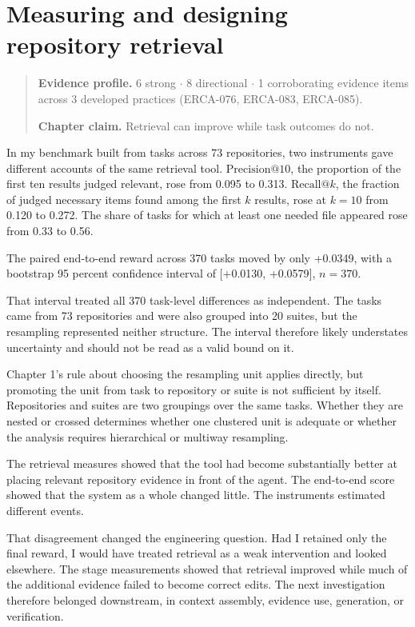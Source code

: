 \chapter{Measuring and designing repository retrieval}
\label{ch11-measuring-designing-repository-retrieval}
\begin{quote}
\textbf{Evidence profile.} 6 strong \(\cdot\) 8 directional \(\cdot\) 1 corroborating evidence items across 3 developed practices (ERCA-076, ERCA-083, ERCA-085).

\textbf{Chapter claim.} Retrieval can improve while task outcomes do not.
\end{quote}

In my benchmark built from tasks across 73 repositories, two instruments gave different accounts of the same retrieval tool. \(\mathrm{Precision}@10\), the proportion of the first ten results judged relevant, rose from 0.095 to 0.313. \textbf{\(\mathrm{Recall}@k\)}, the fraction of judged necessary items found among the first \(k\) results, rose at \(k = 10\) from 0.120 to 0.272. The share of tasks for which at least one needed file appeared rose from 0.33 to 0.56.

The paired end-to-end reward across 370 tasks moved by only +0.0349, with a bootstrap 95 percent confidence interval of {[}+0.0130, +0.0579{]}, \(n = 370\).

That interval treated all 370 task-level differences as independent. The tasks came from 73 repositories and were also grouped into 20 suites, but the resampling represented neither structure. The interval therefore likely understates uncertainty and should not be read as a valid bound on it.

Chapter 1's rule about choosing the resampling unit applies directly, but promoting the unit from task to repository or suite is not sufficient by itself. Repositories and suites are two groupings over the same tasks. Whether they are nested or crossed determines whether one clustered unit is adequate or whether the analysis requires hierarchical or multiway resampling.

The retrieval measures showed that the tool had become substantially better at placing relevant repository evidence in front of the agent. The end-to-end score showed that the system as a whole changed little. The instruments estimated different events.

That disagreement changed the engineering question. Had I retained only the final reward, I would have treated retrieval as a weak intervention and looked elsewhere. The stage measurements showed that retrieval improved while much of the additional evidence failed to become correct edits. The next investigation therefore belonged downstream, in context assembly, evidence use, generation, or verification.

